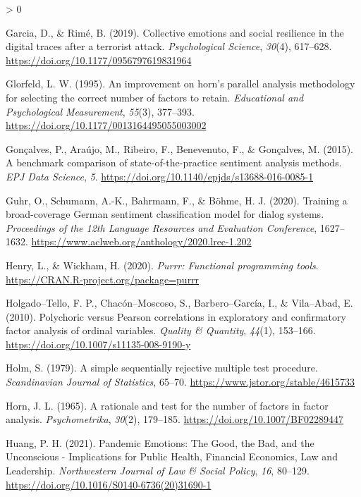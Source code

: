 \documentclass[
  english,
  jou,floatsintext]{apa7}
\newlength{\cslhangindent}
\newenvironment{CSLReferences}[2] %
 {%
  \setlength{\parindent}{0pt}
  \ifodd #1 \everypar{\setlength{\hangindent}{\cslhangindent}}\ignorespaces\fi
  \ifnum #2 > 0
  \setlength{\parskip}{#2\baselineskip}
  \fi
 }%
 {}
\begin{document}
\begin{CSLReferences}{1}{0}
\leavevmode\hypertarget{ref-garcia2019collective}{}%
Garcia, D., \& Rimé, B. (2019). Collective emotions and social resilience in the digital traces after a terrorist attack. \emph{Psychological Science}, \emph{30}(4), 617--628. \url{https://doi.org/10.1177/0956797619831964}

\leavevmode\hypertarget{ref-Glorfeld1995}{}%
Glorfeld, L. W. (1995). An improvement on horn's parallel analysis methodology for selecting the correct number of factors to retain. \emph{Educational and Psychological Measurement}, \emph{55}(3), 377--393. \url{https://doi.org/10.1177/0013164495055003002}

\leavevmode\hypertarget{ref-Goncalves2015}{}%
Gonçalves, P., Araújo, M., Ribeiro, F., Benevenuto, F., \& Gonçalves, M. (2015). A benchmark comparison of state-of-the-practice sentiment analysis methods. \emph{EPJ Data Science}, \emph{5}. \url{https://doi.org/10.1140/epjds/s13688-016-0085-1}

\leavevmode\hypertarget{ref-guhr-etal-2020}{}%
Guhr, O., Schumann, A.-K., Bahrmann, F., \& Böhme, H. J. (2020). Training a broad-coverage {G}erman sentiment classification model for dialog systems. \emph{Proceedings of the 12th Language Resources and Evaluation Conference}, 1627--1632. \url{https://www.aclweb.org/anthology/2020.lrec-1.202}

\leavevmode\hypertarget{ref-R-purrr}{}%
Henry, L., \& Wickham, H. (2020). \emph{Purrr: Functional programming tools}. \url{https://CRAN.R-project.org/package=purrr}

\leavevmode\hypertarget{ref-HolgadoTello2010}{}%
Holgado--Tello, F. P., Chacón--Moscoso, S., Barbero--García, I., \& Vila--Abad, E. (2010). Polychoric versus {Pearson} correlations in exploratory and confirmatory factor analysis of ordinal variables. \emph{Quality \& Quantity}, \emph{44}(1), 153--166. \url{https://doi.org/10.1007/s11135-008-9190-y}

\leavevmode\hypertarget{ref-holm1979}{}%
Holm, S. (1979). A simple sequentially rejective multiple test procedure. \emph{Scandinavian Journal of Statistics}, 65--70. \url{https://www.jstor.org/stable/4615733}

\leavevmode\hypertarget{ref-Horn1965}{}%
Horn, J. L. (1965). A rationale and test for the number of factors in factor analysis. \emph{Psychometrika}, \emph{30}(2), 179--185. \url{https://doi.org/10.1007/BF02289447}

\leavevmode\hypertarget{ref-Huang2020}{}%
Huang, P. H. (2021). {Pandemic Emotions: The Good, the Bad, and the Unconscious - Implications for Public Health, Financial Economics, Law and Leadership}. \emph{Northwestern Journal of Law \& Social Policy}, \emph{16}, 80--129. \url{https://doi.org/10.1016/S0140-6736(20)31690-1}


\end{CSLReferences}
\end{document}

